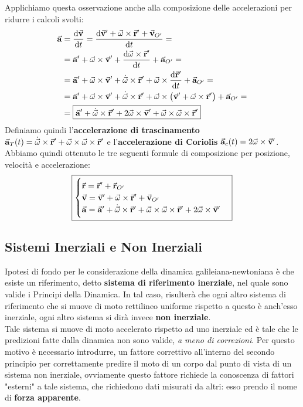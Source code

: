 \documentclass{report}
\renewcommand{\a}{\va{a}}
\renewcommand{\v}{\va{v}}
\renewcommand{\r}{\va{r}}
\begin{document}
Applichiamo questa osservazione anche alla composizione delle accelerazioni per ridurre i calcoli svolti:
\begin{equation}
\begin{split}
    \a&=\dv{\v}{t}=\dv{\v'+\va{\omega}\times\r'+\v_{O'}}{t}=\\
    &=\a'+\va{\omega}\times\v'+\dv{\va{\omega}\times\r'}{t}+\a_{O'}=\\
    &=\a'+\va{\omega}\times\v'+\Dot{\va{\omega}}\times\r'+\va{\omega}\times\dv{\r'}{t}+\a_{O'}=\\
    &=\a'+\va{\omega}\times\v'+\Dot{\va{\omega}}\times\r'+\va{\omega}\times\left(\v'+\va{\omega}\times\r'\right)+\a_{O'}=\\
    &=\boxed{\a'+\Dot{\va{\omega}}\times\r'+2\va{\omega}\times\v'+\va{\omega}\times\va{\omega}\times\r'}
\end{split}
\end{equation}
Definiamo quindi l'\textbf{accelerazione di trascinamento} $\a_T(t)=\Dot{\va{\omega}}\times\r'+\va{\omega}\times\va{\omega}\times\r'$ e l'\textbf{accelerazione di Coriolis} $\a_c(t)=2\va{\omega}\times\v'$.\\
Abbiamo quindi ottenuto le tre seguenti formule di composizione per posizione, velocità e accelerazione:
\begin{equation}
\boxed{\begin{cases}
    \r=\r'+\r_{O'}\\
    \v=\v'+\va{\omega}\times\r'+\v_{O'}\\
    \a=\a'+\Dot{\va{\omega}}\times\r'+\va{\omega}\times\va{\omega}\times\r'+2\va{\omega}\times\v'
\end{cases}}
\end{equation}

\subsection{Sistemi Inerziali e Non Inerziali}
Ipotesi di fondo per le considerazione della dinamica galileiana-newtoniana è che esiste un riferimento, detto \textbf{sistema di riferimento inerziale}, nel quale sono valide i Principi della Dinamica. In tal caso, risulterà che ogni altro sistema di riferimento che si muove di moto rettilineo uniforme rispetto a questo è anch'esso inerziale, ogni altro sistema si dirà invece \textbf{non inerziale}.\\
Tale sistema si muove di moto accelerato rispetto ad uno inerziale ed è tale che le predizioni fatte dalla dinamica non sono valide, \textit{a meno di correzioni}. Per questo motivo è necessario introdurre, un fattore correttivo all'interno del secondo principio per correttamente predire il moto di un corpo dal punto di vista di un sistema non inerziale, ovviamente questo fattore richiede la conoscenza di fattori "esterni" a tale sistema, che richiedono dati misurati da altri: esso prendo il nome di \textbf{forza apparente}.\\
\end{document}
